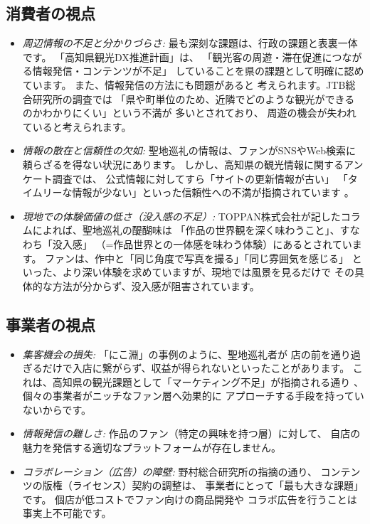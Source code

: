 \documentclass{docs}
\begin{document}
\subsection{消費者の視点}
\begin{itemize}
	\item \emph{周辺情報の不足と分かりづらさ:}
    最も深刻な課題は、行政の課題\cite{kochi_dx_plan}と表裏一体です。
    「高知県観光DX推進計画」\cite{kochi_dx_plan}は、
    「観光客の周遊・滞在促進につながる情報発信・コンテンツが不足」
    していることを県の課題として明確に認めています。
	また、情報発信の方法にも問題があると
	考えられます。JTB総合研究所の調査\cite{jtb_trc_2017}では
	「県や町単位のため、近隣でどのような観光ができるのかわかりにくい」という不満が
	多いとされており、
	周遊の機会が失われていると考えられます。

    \item \emph{情報の散在と信頼性の欠如:}
    聖地巡礼の情報は、ファンがSNSやWeb検索に頼らざるを得ない状況にあります。
    しかし、高知県の観光情報に関するアンケート調査では、
    公式情報に対してすら「サイトの更新情報が古い」
    「タイムリーな情報が少ない」といった信頼性への不満が指摘されています
    \cite{kochi_tech_2017}。

    \item \emph{現地での体験価値の低さ（没入感の不足）:}
    TOPPAN株式会社が記したコラム\cite{toppan2025}によれば、聖地巡礼の醍醐味は
    「作品の世界観を深く味わうこと」、すなわち「没入感」
    （=作品世界との一体感を味わう体験）にあるとされています。
    ファンは、作中と「同じ角度で写真を撮る」「同じ雰囲気を感じる」
    といった、より深い体験を求めていますが、現地では風景を見るだけで
    その具体的な方法が分からず、没入感が阻害されています。
\end{itemize}


\subsection{事業者の視点}
\begin{itemize}
\item \emph{集客機会の損失:}
    「にこ淵」の事例\cite{nikobuchi_mlit}のように、聖地巡礼者が
    店の前を通り過ぎるだけで入店に繋がらず、収益が得られないといったことがあります。
    これは、高知県の観光課題として「マーケティング不足」が指摘される通り
    \cite{kochi_tech_2017}、
    個々の事業者がニッチなファン層へ効果的に
    アプローチする手段を持っていないからです。

    \item \emph{情報発信の難しさ:}
    作品のファン（特定の興味を持つ層）に対して、
    自店の魅力を発信する適切なプラットフォームが存在しません。

    \item \emph{コラボレーション（広告）の障壁:}
    野村総合研究所の指摘\cite{nri2024}の通り、
    コンテンツの版権（ライセンス）契約の調整は、
    事業者にとって「最も大きな課題」です。
    個店が低コストでファン向けの商品開発や
    コラボ広告を行うことは事実上不可能です。
\end{itemize}
\end{document}
